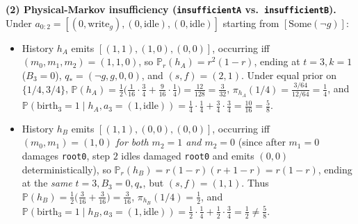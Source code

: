 \documentclass[11pt,letterpaper]{article}
\providecommand{\tightlist}{\setlength{\itemsep}{2pt}\setlength{\parskip}{0pt}}
\begin{document}
\textbf{(2) Physical-Markov insufficiency (\texttt{insufficientA}
vs.~\texttt{insufficientB}).} Under
\(a_{0:2} = [(0,\mathrm{write}_g), (0,\mathrm{idle}), (0,\mathrm{idle})]\)
starting from \([\mathrm{Some}(\neg g)]\):

\begin{itemize}
\tightlist
\item
  History \(h_A\) emits \([(1,1), (1,0), (0,0)]\), occurring iff
  \((m_0, m_1, m_2) = (1, 1, 0)\), so \(\mathbb{P}_r(h_A) = r^2(1-r)\),
  ending at \(t=3, k=1\) (\(B_3 = 0\)), \(q_* = (\neg g, g, 0, 0)\), and
  \((s,f) = (2,1)\). Under equal prior on \(\{1/4, 3/4\}\),
  \(\mathbb{P}(h_A) = \frac{1}{2}\bigl(\frac{1}{16}\cdot\frac{3}{4} + \frac{9}{16}\cdot\frac{1}{4}\bigr) = \frac{12}{128} = \frac{3}{32}\),
  \(\pi_{h_A}(1/4) = \frac{3/64}{12/64} = \frac{1}{4}\), and
  \(\mathbb{P}(\mathrm{birth}_3 = 1 \mid h_A, a_3 = (1,\mathrm{idle})) = \frac{1}{4}\cdot\frac{1}{4} + \frac{3}{4}\cdot\frac{3}{4} = \frac{10}{16} = \frac{5}{8}\).
\item
  History \(h_B\) emits \([(1,1), (0,0), (0,0)]\), occurring iff
  \((m_0, m_1) = (1, 0)\) \emph{for both \(m_2 = 1\) and \(m_2 = 0\)}
  (since after \(m_1 = 0\) damages \texttt{root0}, step \(2\) idles
  damaged \texttt{root0} and emits \((0,0)\) deterministically), so
  \(\mathbb{P}_r(h_B) = r(1-r)(r + 1 - r) = r(1-r)\), ending at the
  \emph{same} \(t=3, B_3=0, q_*\), but \((s,f) = (1,1)\). Thus
  \(\mathbb{P}(h_B) = \frac{1}{2}\bigl(\frac{3}{16} + \frac{3}{16}\bigr) = \frac{3}{16}\),
  \(\pi_{h_B}(1/4) = \frac{1}{2}\), and
  \(\mathbb{P}(\mathrm{birth}_3 = 1 \mid h_B, a_3 = (1,\mathrm{idle})) = \frac{1}{2}\cdot\frac{1}{4} + \frac{1}{2}\cdot\frac{3}{4} = \frac{1}{2} \neq \frac{5}{8}\).
\end{itemize}
\end{document}

